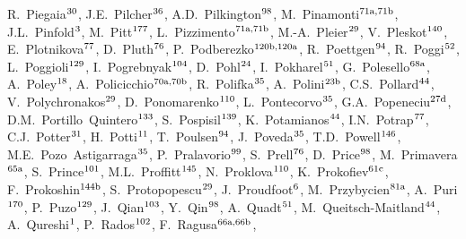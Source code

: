 \begin{flushleft}
R.~Piegaia$^\textrm{\scriptsize 30}$,    
J.E.~Pilcher$^\textrm{\scriptsize 36}$,    
A.D.~Pilkington$^\textrm{\scriptsize 98}$,    
M.~Pinamonti$^\textrm{\scriptsize 71a,71b}$,    
J.L.~Pinfold$^\textrm{\scriptsize 3}$,    
M.~Pitt$^\textrm{\scriptsize 177}$,    
L.~Pizzimento$^\textrm{\scriptsize 71a,71b}$,    
M.-A.~Pleier$^\textrm{\scriptsize 29}$,    
V.~Pleskot$^\textrm{\scriptsize 140}$,    
E.~Plotnikova$^\textrm{\scriptsize 77}$,    
D.~Pluth$^\textrm{\scriptsize 76}$,    
P.~Podberezko$^\textrm{\scriptsize 120b,120a}$,    
R.~Poettgen$^\textrm{\scriptsize 94}$,    
R.~Poggi$^\textrm{\scriptsize 52}$,    
L.~Poggioli$^\textrm{\scriptsize 129}$,    
I.~Pogrebnyak$^\textrm{\scriptsize 104}$,    
D.~Pohl$^\textrm{\scriptsize 24}$,    
I.~Pokharel$^\textrm{\scriptsize 51}$,    
G.~Polesello$^\textrm{\scriptsize 68a}$,    
A.~Poley$^\textrm{\scriptsize 18}$,    
A.~Policicchio$^\textrm{\scriptsize 70a,70b}$,    
R.~Polifka$^\textrm{\scriptsize 35}$,    
A.~Polini$^\textrm{\scriptsize 23b}$,    
C.S.~Pollard$^\textrm{\scriptsize 44}$,    
V.~Polychronakos$^\textrm{\scriptsize 29}$,    
D.~Ponomarenko$^\textrm{\scriptsize 110}$,    
L.~Pontecorvo$^\textrm{\scriptsize 35}$,    
G.A.~Popeneciu$^\textrm{\scriptsize 27d}$,    
D.M.~Portillo~Quintero$^\textrm{\scriptsize 133}$,    
S.~Pospisil$^\textrm{\scriptsize 139}$,    
K.~Potamianos$^\textrm{\scriptsize 44}$,    
I.N.~Potrap$^\textrm{\scriptsize 77}$,    
C.J.~Potter$^\textrm{\scriptsize 31}$,    
H.~Potti$^\textrm{\scriptsize 11}$,    
T.~Poulsen$^\textrm{\scriptsize 94}$,    
J.~Poveda$^\textrm{\scriptsize 35}$,    
T.D.~Powell$^\textrm{\scriptsize 146}$,    
M.E.~Pozo~Astigarraga$^\textrm{\scriptsize 35}$,    
P.~Pralavorio$^\textrm{\scriptsize 99}$,    
S.~Prell$^\textrm{\scriptsize 76}$,    
D.~Price$^\textrm{\scriptsize 98}$,    
M.~Primavera$^\textrm{\scriptsize 65a}$,    
S.~Prince$^\textrm{\scriptsize 101}$,    
M.L.~Proffitt$^\textrm{\scriptsize 145}$,    
N.~Proklova$^\textrm{\scriptsize 110}$,    
K.~Prokofiev$^\textrm{\scriptsize 61c}$,    
F.~Prokoshin$^\textrm{\scriptsize 144b}$,    
S.~Protopopescu$^\textrm{\scriptsize 29}$,    
J.~Proudfoot$^\textrm{\scriptsize 6}$,    
M.~Przybycien$^\textrm{\scriptsize 81a}$,    
A.~Puri$^\textrm{\scriptsize 170}$,    
P.~Puzo$^\textrm{\scriptsize 129}$,    
J.~Qian$^\textrm{\scriptsize 103}$,    
Y.~Qin$^\textrm{\scriptsize 98}$,    
A.~Quadt$^\textrm{\scriptsize 51}$,    
M.~Queitsch-Maitland$^\textrm{\scriptsize 44}$,    
A.~Qureshi$^\textrm{\scriptsize 1}$,    
P.~Rados$^\textrm{\scriptsize 102}$,    
F.~Ragusa$^\textrm{\scriptsize 66a,66b}$,    

\end{flushleft}
